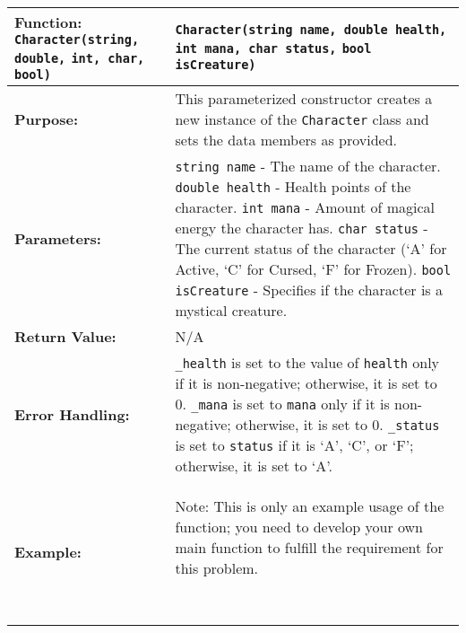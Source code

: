 \renewcommand{\arraystretch}{1.5}
\begin{longtable}{|p{1.7in}|p{4.3in}|}
\hline
\textbf{Function:} \texttt{Character(string, double,} \newline \texttt{int, char, bool)} & \texttt{Character(string name, double health, int mana, char status,} \newline \texttt{bool isCreature)} \\ \hline

\textbf{Purpose:} & This parameterized constructor creates a new instance of the \texttt{Character} class and sets the data members as provided. \\ \hline

\textbf{Parameters:} & 
\texttt{string name} - The name of the character. \newline
\texttt{double health} - Health points of the character. \newline
\texttt{int mana} - Amount of magical energy the character has. \newline
\texttt{char status} - The current status of the character (`A' for Active, `C' for Cursed, `F' for Frozen). \newline
\texttt{bool isCreature} - Specifies if the character is a mystical creature. \\ \hline

\textbf{Return Value:} & N/A \\ \hline

\textbf{Error Handling:} & 
\texttt{_health} is set to the value of \texttt{health} only if it is non-negative; otherwise, it is set to 0. \newline
\texttt{_mana} is set to \texttt{mana} only if it is non-negative; otherwise, it is set to 0. \newline
\texttt{_status} is set to \texttt{status} if it is `A', `C', or `F'; otherwise, it is set to `A'. \\ \hline

\textbf{Example:} & 

\begin{example}

Note: This is only an example usage of the function; you need to develop your own main function to fulfill the requirement for this problem.

\begin{verbatim}


\end{verbatim}
\end{example}
\end{longtable}
